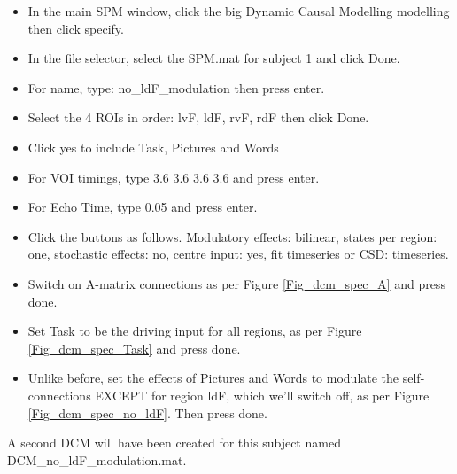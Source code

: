 \documentclass{article}
\begin{document}
\begin{itemize}
    \item In the main SPM window, click the big Dynamic Causal Modelling modelling then click specify.
    \item In the file selector, select the SPM.mat for subject 1 and click Done.
    \item For name, type: no\_ldF\_modulation then press enter.
    \item Select the 4 ROIs in order: lvF, ldF, rvF, rdF then click Done.
    \item Click yes to include Task, Pictures and Words
    \item For VOI timings, type 3.6  3.6  3.6  3.6 and press enter. 
    \item For Echo Time, type 0.05 and press enter.
    \item Click the buttons as follows. Modulatory effects: bilinear, states per region: one, stochastic effects: no, centre input: yes, fit timeseries or CSD: timeseries.
    \item Switch on A-matrix connections as per Figure \ref{Fig_dcm_spec_A} and press done.
    \item Set Task to be the driving input for all regions, as per Figure \ref{Fig_dcm_spec_Task} and press done.
    \item Unlike before, set the effects of Pictures and Words to modulate the self-connections EXCEPT for region ldF, which we'll switch off, as per Figure \ref{Fig_dcm_spec_no_ldF}. Then press done.
\end{itemize}

A second DCM will have been created for this subject named DCM\_no\_ldF\_modulation.mat.
\end{document}
